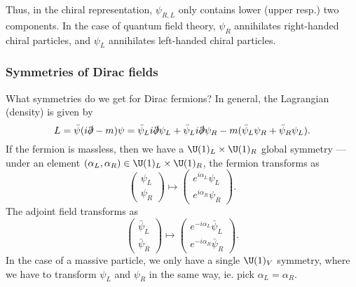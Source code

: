 \documentclass[a4paper]{article}
\begin{document}
Thus, in the chiral representation, $\psi_{R, L}$ only contains lower (upper resp.) two components. In the case of quantum field theory, $\psi_R$ annihilates right-handed chiral particles, and $\psi_L$ annihilates left-handed chiral particles.

\subsubsection*{Symmetries of Dirac fields}

What symmetries do we get for Dirac fermions? In general, the Lagrangian (density) is given by
\[
  L = \bar\psi (i \slashed{\partial} - m) \psi = \bar\psi_L i \slashed{\partial} \psi_L + \bar\psi_L i \slashed{\partial} \psi_R - m (\bar\psi_L \psi_R + \bar\psi_R \psi_L).
\]
If the fermion is massless, then we have a $\U(1)_L \times \U(1)_R$ global symmetry --- under an element $(\alpha_L, \alpha_R) \in \U(1)_L \times \U(1)_R$, the fermion transforms as
\[
  \begin{pmatrix}
    \psi_L\\
    \psi_R
  \end{pmatrix} \mapsto
  \begin{pmatrix}
    e^{i\alpha_L} \psi_L\\
    e^{i\alpha_R} \psi_R
  \end{pmatrix}.
\]
The adjoint field transforms as
\[
  \begin{pmatrix}
    \bar{\psi}_L\\
    \bar{\psi}_R
  \end{pmatrix} \mapsto
  \begin{pmatrix}
    e^{-i\alpha_L} \bar{\psi}_L\\
    e^{-i\alpha_R} \bar{\psi}_R
  \end{pmatrix}.
\]
In the case of a massive particle, we only have a single $\U(1)_V$ symmetry, where we have to transform $\psi_L$ and $\psi_R$ in the same way, ie. pick $\alpha_L = \alpha_R$.
\end{document}
